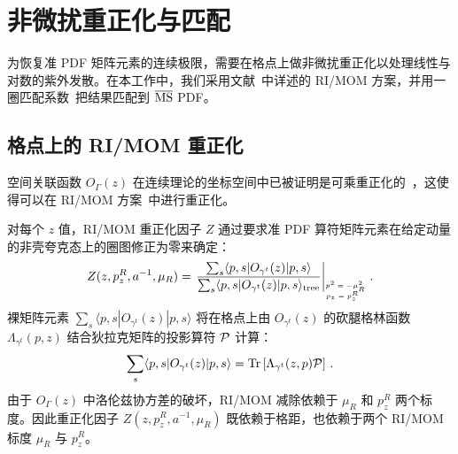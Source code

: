 \section{非微扰重正化与匹配}\label{sec:matching}

为恢复准 PDF 矩阵元素的连续极限，需要在格点上做非微扰重正化以处理线性与对数的紫外发散。在本工作中，我们采用文献~\cite{Stewart:2017tvs,Chen:2017mzz}中详述的 RI/MOM 方案，并用一圈匹配系数~\cite{Stewart:2017tvs}把结果匹配到 $\overline{\rm MS}$ PDF。

\subsection{格点上的 RI/MOM 重正化}\label{subsec:rimom}

空间关联函数 $O_\Gamma(z)$ 在连续理论的坐标空间中已被证明是可乘重正化的~\cite{Ji:2017oey,Ishikawa:2017faj}，这使得可以在 RI/MOM 方案~\cite{Martinelli:1994ty}中进行重正化。

对每个 $z$ 值，RI/MOM 重正化因子 $Z$ 通过要求准 PDF 算符矩阵元素在给定动量的非壳夸克态上的圈图修正为零来确定：
\begin{align}\label{eq:Z}
Z(z,p^R_z,a^{-1},\mu_R)=\left.\frac{\sum_s\langle p,s|O_{\gamma^t}(z)|p,s\rangle}{\sum_s\langle p,s|O_{\gamma^t}(z)|p,s\rangle_{\rm tree}}\right|_{\tiny\begin{matrix}p^2=-\mu_R^2 \\ \!\!\!\!p_z=p^R_z\end{matrix}}\,.
\end{align}
裸矩阵元素 $\sum_s\langle p,s|O_{\gamma^t}(z)|p,s\rangle$ 将在格点上由 $O_{\gamma^t}(z)$ 的砍腿格林函数 $\Lambda_{\gamma^t}(p,z)$ 结合狄拉克矩阵的投影算符 ${\cal P}$ 计算：
\begin{equation}
\sum_s\langle p,s|O_{\gamma^t}(z)|p,s\rangle = \mbox{Tr}\left[ \Lambda_{\gamma^t}(z,p){\cal P}\right]\,.
\end{equation}
由于 $O_\Gamma(z)$ 中洛伦兹协方差的破坏，RI/MOM 减除依赖于 $\mu_R$ 和 $p_z^R$ 两个标度。因此重正化因子 $Z(z,p^R_z,a^{-1},\mu_R)$ 既依赖于格距，也依赖于两个 RI/MOM 标度 $\mu_R$ 与 $p^R_z$。

